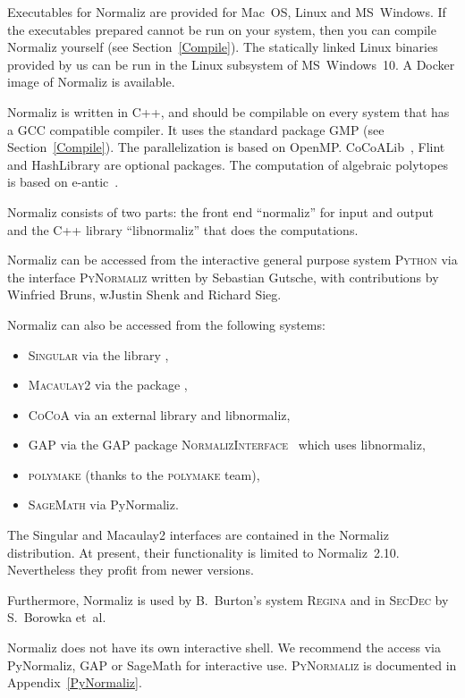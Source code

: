 Executables for Normaliz are provided for Mac~OS, Linux and MS~Windows. If the executables prepared cannot be run on your system, then you can compile Normaliz yourself (see Section~\ref{Compile}). The statically linked Linux binaries provided by us can be run in the Linux subsystem of MS~Windows~10. A Docker image of Normaliz is available.

Normaliz is written in C++, and should be compilable on every system that has a GCC compatible compiler. It uses the standard package GMP (see Section~\ref{Compile}). The parallelization is based on OpenMP. CoCoALib~\cite{CoCoA}, Flint~\cite{Flint} and HashLibrary \cite{has} are optional packages. The computation of algebraic polytopes is based on e-antic~\cite{e-antic}.

Normaliz consists of two parts: the front end ``normaliz'' for input and output and the C++ library ``libnormaliz'' that does the computations.

Normaliz can be accessed from the interactive general purpose system \textsc{Python} via the interface \textsc{PyNormaliz} written by Sebastian Gutsche, with contributions by Winfried Bruns, wJustin Shenk and Richard Sieg.

Normaliz can also be accessed from the following systems:
\begin{itemize}
	\item \textsc{Singular} via the library ,
	\item \textsc{Macaulay2} via the package ,
	\item \textsc{CoCoA} via an external library and libnormaliz,
	\item \textsc{GAP} via the GAP package \textsc{NormalizInterface}~\cite{GAP-NmzInterface} which uses libnormaliz,
	\item \textsc{polymake} (thanks to the \textsc{polymake}
	team),
	\item \textsc{SageMath} via PyNormaliz.
\end{itemize}

The Singular and Macaulay2 interfaces are contained in the
Normaliz distribution. At present, their functionality is limited to Normaliz~2.10. Nevertheless they profit from newer versions.

Furthermore, Normaliz is used by B.~Burton's system
\textsc{Regina} and in \textsc{SecDec} by S.~Borowka et~al.

Normaliz does not have its own interactive shell. We recommend the access via PyNormaliz, GAP or SageMath for interactive use. \textsc{PyNormaliz} is documented in Appendix~\ref{PyNormaliz}.


